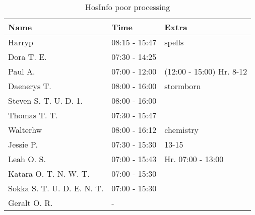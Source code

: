 \begin{table}[H]
    \centering
    \begin{tabular}{|l|l|l|}
        \hline
        \textbf{Name}              & \textbf{Time} & \textbf{Extra}           \\ \hline
        Harryp                     & 08:15 - 15:47 & spells                   \\ \hline
        Dora T. E.                 & 07:30 - 14:25 &                          \\ \hline
        Paul A.                    & 07:00 - 12:00 & (12:00 - 15:00) Hr. 8-12 \\ \hline
        Daenerys T.                & 08:00 - 16:00 & stormborn                \\ \hline
        Steven S. T. U. D. 1.      & 08:00 - 16:00 &                          \\ \hline
        Thomas T. T.               & 07:30 - 15:47 &                          \\ \hline
        Walterhw                   & 08:00 - 16:12 & chemistry                \\ \hline
        Jessie P.                  & 07:30 - 15:30 & 13-15                    \\ \hline
        Leah O. S.                 & 07:00 - 15:43 & Hr. 07:00 - 13:00        \\ \hline
        Katara O. T. N. W. T.      & 07:00 - 15:30 &                          \\ \hline
        Sokka S. T. U. D. E. N. T. & 07:00 - 15:30 &                          \\ \hline
        Geralt O. R.               & -             &                          \\ \hline
    \end{tabular}
    \caption{HosInfo poor processing}
    \label{tab:HosInfo-poor-processing}
\end{table}

